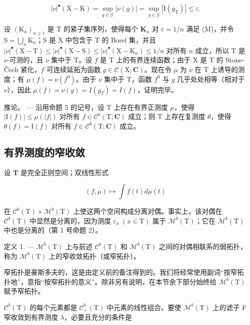 \[
| \nu | ^ {\bullet} (\mathrm{X} - \mathrm{K}) = \sup _ {g \in \mathcal {G}} | \nu (g) | = \sup _ {g \in \mathcal {G}} | \mathrm{I} (g _ {\mathrm{T}}) | \leqslant \varepsilon .
\]

设 \((\mathrm{K}_n)_{n\geqslant 1}\) 是 T 的紧子集序列，使得每个 \(\mathbf{K}_n\) 对 \(\varepsilon = 1 / n\) 满足 (M)，并令 \(\mathrm{S} = \bigcup_{n}\mathrm{K}_{n}\)；S 是 X 中包含于 T 的 Borel 集，并且 \(|\nu|^{\bullet}(\mathrm{X} - \mathrm{T})\leqslant |\nu |^{\bullet}(\mathrm{X} - \mathrm{S})\leqslant |\nu |^{\bullet}(\mathrm{X} - \mathrm{K}_n)\leqslant 1 / n\) 对所有 \(n\) 成立，所以 T 是 \(\nu\)-可测的，且 \(\nu\) 集中于 T。设 \(f\) 是 T 上的有界连续函数；由于 X 是 T 的 Stone-Čech 紧化，\(f\) 可连续延拓为函数 \(g\in \mathcal{C}(\mathrm{X};\mathbf{C})\)。现在令 \(\mu\) 为 \(\nu\) 在 T 上诱导的测度；有 \(\mu(f) = \nu(f^0)\)。由于 \(\nu\) 集中于 T，函数 \(f^0\) 与 \(g\) 几乎处处相等（相对于 \(\nu\)），因此 \(\mu(f) = \nu(g) = I(g_T) = I(f)\)，证明完毕。

推论。 --- 沿用命题 5 的记号，设 T 上存在有界正测度 \(\mu\)，使得 \(|\mathrm{I}(f)| \leqslant \mu(|f|)\) 对所有 \(f \in \mathcal{C}^b(\mathrm{T};\mathbf{C})\) 成立；则 T 上存在复测度 \(\theta\)，使得 \(\theta(f) = \mathrm{I}(f)\) 对所有 \(f \in \mathcal{C}^b(\mathrm{T};\mathbf{C})\) 成立。

\subsection{有界测度的窄收敛}

设 \(\mathbf{T}\) 是完全正则空间；双线性形式

\[
(f, \mu) \mapsto \int f (t) d \mu (t)
\]

在 \(\mathcal{C}^{b}(\mathrm{T})\times\mathcal{M}^{b}(\mathrm{T})\) 上使这两个空间构成分离对偶。事实上，该对偶在 \(\mathcal{C}^{b}(\mathrm{T})\) 中显然是分离的，因为测度 \(\varepsilon_{x}\;(x\in\mathrm{T})\) 属于 \(\mathcal{M}^{b}(\mathrm{T})\)；它在 \(\mathcal{M}^{b}(\mathrm{T})\) 中也是分离的（第 1 号命题 2）。

定义 1. --- \(\mathcal{M}^{b}(\mathrm{T})\) 上与前述 \(\mathcal{C}^{b}(\mathrm{T})\) 和 \(\mathcal{M}^{b}(\mathrm{T})\) 之间的对偶相联系的弱拓扑，称为 \(\mathcal{M}^{b}(\mathrm{T})\) 上的窄收敛拓扑（或窄拓扑）。

窄拓扑是豪斯多夫的，这是由定义前的备注得到的。我们将经常使用副词“按窄拓扑地”，意指“按窄拓扑的意义”。除非另有说明，在本节余下部分始终给 \(\mathcal{M}^b (\mathrm{T})\) 赋予窄拓扑。

\(\mathcal{C}^{b}(\mathrm{T})\) 的每个元素都是 \(\mathcal{C}_{+}^{b}(\mathrm{T})\) 中元素的线性组合。要使 \(\mathcal{M}^{b}(\mathrm{T})\) 上的滤子 F 窄收敛到有界测度 \(\lambda\)，必要且充分的条件是

